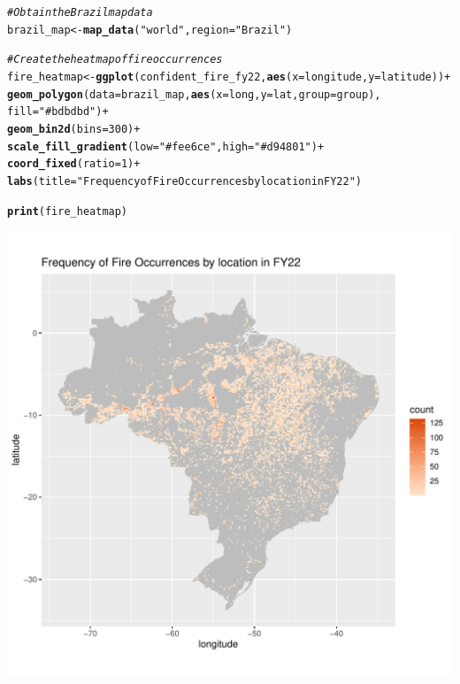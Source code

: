 \documentclass{article}\usepackage[]{graphicx}\usepackage[]{xcolor}
\makeatletter
\def\maxwidth{ %
  \ifdim\Gin@nat@width>\linewidth
    \linewidth
  \else
    \Gin@nat@width
  \fi
}
\newcommand{\hlnum}[1]{\textcolor[rgb]{0.686,0.059,0.569}{#1}}%
\newcommand{\hlstr}[1]{\textcolor[rgb]{0.192,0.494,0.8}{#1}}%
\newcommand{\hlcom}[1]{\textcolor[rgb]{0.678,0.584,0.686}{\textit{#1}}}%
\newcommand{\hlopt}[1]{\textcolor[rgb]{0,0,0}{#1}}%
\newcommand{\hlstd}[1]{\textcolor[rgb]{0.345,0.345,0.345}{#1}}%
\newcommand{\hlkwb}[1]{\textcolor[rgb]{0.69,0.353,0.396}{#1}}%
\newcommand{\hlkwc}[1]{\textcolor[rgb]{0.333,0.667,0.333}{#1}}%
\newcommand{\hlkwd}[1]{\textcolor[rgb]{0.737,0.353,0.396}{\textbf{#1}}}%
\newenvironment{kframe}{%
 \def\at@end@of@kframe{}%
 \ifinner\ifhmode%
  \def\at@end@of@kframe{\end{minipage}}%
  \begin{minipage}{\columnwidth}%
 \fi\fi%
 \def\FrameCommand##1{\hskip\@totalleftmargin \hskip-\fboxsep
 \colorbox{shadecolor}{##1}\hskip-\fboxsep
     \hskip-\linewidth \hskip-\@totalleftmargin \hskip\columnwidth}%
 \MakeFramed {\advance\hsize-\width
   \@totalleftmargin\z@ \linewidth\hsize
   \@setminipage}}%
 {\par\unskip\endMakeFramed%
 \at@end@of@kframe}
\newenvironment{knitrout}{}{} %
\makeatother
\begin{document}
\begin{knitrout}
\color{fgcolor}\begin{kframe}
\begin{alltt}
\hlcom{# Obtain the Brazil map data}
\hlstd{brazil_map} \hlkwb{<-} \hlkwd{map_data}\hlstd{(}\hlstr{"world"}\hlstd{,} \hlkwc{region} \hlstd{=} \hlstr{"Brazil"}\hlstd{)}

\hlcom{# Create the heatmap of fire occurrences}
\hlstd{fire_heatmap} \hlkwb{<-} \hlkwd{ggplot}\hlstd{(confident_fire_fy22,} \hlkwd{aes}\hlstd{(}\hlkwc{x} \hlstd{= longitude,} \hlkwc{y} \hlstd{= latitude))} \hlopt{+}
  \hlkwd{geom_polygon}\hlstd{(}\hlkwc{data} \hlstd{= brazil_map,} \hlkwd{aes}\hlstd{(}\hlkwc{x} \hlstd{= long,} \hlkwc{y} \hlstd{= lat,} \hlkwc{group} \hlstd{= group),}
               \hlkwc{fill} \hlstd{=} \hlstr{"#bdbdbd"}\hlstd{)} \hlopt{+}
  \hlkwd{geom_bin2d}\hlstd{(}\hlkwc{bins} \hlstd{=} \hlnum{300}\hlstd{)} \hlopt{+}
  \hlkwd{scale_fill_gradient}\hlstd{(}\hlkwc{low} \hlstd{=} \hlstr{"#fee6ce"}\hlstd{,} \hlkwc{high} \hlstd{=} \hlstr{"#d94801"}\hlstd{)} \hlopt{+}
  \hlkwd{coord_fixed}\hlstd{(}\hlkwc{ratio} \hlstd{=} \hlnum{1}\hlstd{)} \hlopt{+}
  \hlkwd{labs}\hlstd{(}\hlkwc{title} \hlstd{=} \hlstr{"Frequency of Fire Occurrences by location in FY22"}\hlstd{)}

\hlkwd{print}\hlstd{(fire_heatmap)}
\end{alltt}
\end{kframe}
\includegraphics[width=\maxwidth]{figure/fire-by-location-fy22-1} 
\end{knitrout}
\end{document}

